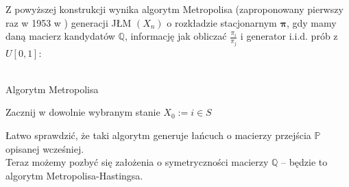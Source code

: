 \documentclass[a4paper]{article}
\theoremstyle{defn}
\theoremstyle{theorem}
\theoremstyle{lemma}
\theoremstyle{cor}
\theoremstyle{fact}
\begin{document}
Z powyższej konstrukcji wynika algorytm Metropolisa (zaproponowany pierwszy raz w 1953 w \cite{metropolis}) generacji JŁM $(X_n)$ o rozkładzie stacjonarnym $\boldsymbol{\pi}$, gdy mamy daną macierz kandydatów $\mathbb{Q}$, informację jak obliczać $\frac{\pi_i}{\pi_j}$ i generator  i.i.d. prób z $U[0,1]$:\\\\
\begin{algorithm}[H]
\caption{Algorytm Metropolisa}
Zacznij w dowolnie wybranym stanie $X_0 := i \in S$\\
\end{algorithm}
Łatwo sprawdzić, że taki algorytm generuje łańcuch o macierzy przejścia $\mathbb{P}$ opisanej wcześniej.\\

Teraz możemy pozbyć się założenia o symetryczności macierzy $\mathbb{Q}$ – będzie to algorytm Metropolisa-Hastingsa.\\
\end{document}
